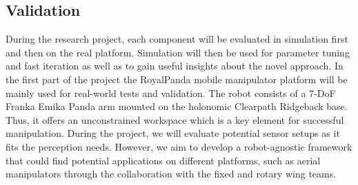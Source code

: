 \subsection{Validation} 
During the research project, each component will be evaluated in simulation first and then on the real platform. Simulation will then be used for parameter tuning and fast iteration as well as to gain useful insights about the novel approach. In the first part of the project the RoyalPanda mobile manipulator platform will be mainly used for real-world tests and validation. The robot consists of a 7-DoF Franka Emika Panda arm mounted on the holonomic Clearpath Ridgeback base. Thus, it offers an unconstrained workspace which is a key element for successful manipulation. During the project, we will evaluate potential sensor setups as it fits the perception needs. However, we aim to develop a robot-agnostic framework that could find potential applications on different platforms, such as aerial manipulators through the collaboration with the fixed and rotary wing teams. 